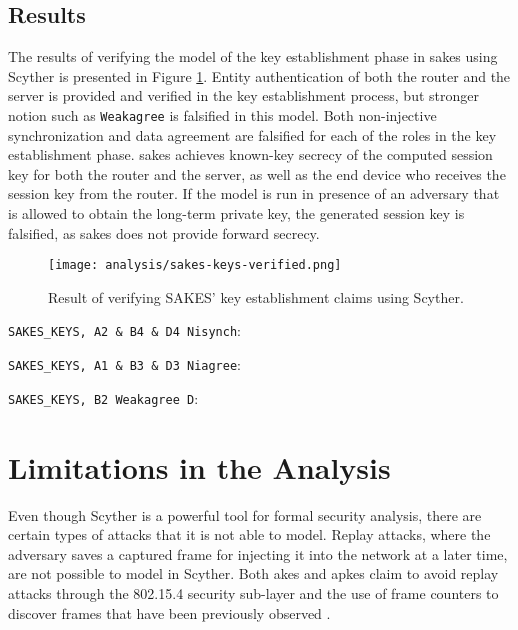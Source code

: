 \subsection{Results}

The results of verifying the model of the key establishment phase in \gls{sakes} using Scyther is presented in Figure \ref{fig:sakes-verified-keys}. Entity authentication of both the router and the server is provided and verified in the key establishment process, but stronger notion such as \texttt{Weakagree} is falsified in this model. Both non-injective synchronization and data agreement are falsified for each of the roles in the key establishment phase. \gls{sakes} achieves known-key secrecy of the computed session key for both the router and the server, as well as the end device who receives the session key from the router.  If the model is run in presence of an adversary that is allowed to obtain the long-term private key, the generated session key is falsified, as \gls{sakes} does not provide forward secrecy.

\begin{figure}[h]
	\centering
	\texttt{[image: analysis/sakes-keys-verified.png]}
	\caption{Result of verifying SAKES' key establishment claims using Scyther.}
	\label{fig:sakes-verified-keys}
\end{figure}

\begin{list}{•}{}

\item \texttt{SAKES\_KEYS, A2 \& B4 \& D4 Nisynch}:

\item \texttt{SAKES\_KEYS, A1 \& B3 \& D3 Niagree}:

\item \texttt{SAKES\_KEYS, B2 Weakagree D}:
\end{list}







\section{Limitations in the Analysis}

Even though Scyther is a powerful tool for formal security analysis, there are certain types of attacks that it is not able to model. Replay attacks, where the adversary saves a captured frame for injecting it into the network at a later time, are not possible to model in Scyther. Both \gls{akes} and \gls{apkes} claim to avoid replay attacks through the 802.15.4 security sub-layer and the use of frame counters to discover frames that have been previously observed \cite{krentz2015handling, krentz20136lowpan}.

